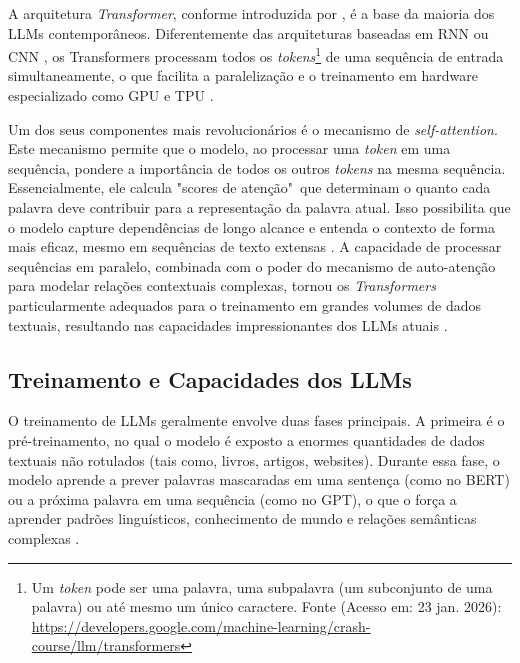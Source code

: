 A arquitetura \textit{Transformer}, conforme introduzida por
, é a base da maioria dos \gls{LLM}s
contemporâneos.  Diferentemente das arquiteturas baseadas em \gls{RNN} ou
\gls{CNN} \cite{lecun1998gradient}, os Transformers processam todos os
\textit{tokens}\footnote{Um \textit{token} pode ser uma palavra, uma subpalavra (um subconjunto de
	uma palavra) ou até mesmo um único caractere.  Fonte (Acesso em: 23 jan. 2026):
	\url{https://developers.google.com/machine-learning/crash-course/llm/transformers}} de
uma sequência de entrada simultaneamente, o que facilita a paralelização e o
treinamento em hardware especializado como \gls{GPU} e \gls{TPU}
\cite{lin2022survey}.

Um dos seus componentes mais revolucionários é o mecanismo de
\textit{self-attention}. Este mecanismo permite que o modelo, ao processar uma
\textit{token} em uma sequência, pondere a importância de todos os outros
\textit{tokens} na mesma sequência. Essencialmente, ele calcula "scores de
atenção"\ que determinam o quanto cada palavra deve contribuir para a
representação da palavra atual. Isso possibilita que o modelo capture
dependências de longo alcance e entenda o contexto de forma mais eficaz, mesmo
em sequências de texto extensas \cite{vaswani2017attention,
	naveed2023comprehensive}. A capacidade de processar sequências em paralelo,
combinada com o poder do mecanismo de auto-atenção para modelar relações
contextuais complexas, tornou os \textit{Transformers} particularmente adequados para o
treinamento em grandes volumes de dados textuais, resultando nas capacidades
impressionantes dos \gls{LLM}s atuais \cite{lin2022survey}.

\subsection{Treinamento e Capacidades dos \texorpdfstring{\gls{LLM}s}{LLMs}}
\label{subsec:treinamento_capacidades_llms}

O treinamento de \gls{LLM}s geralmente envolve duas fases principais. A primeira
é o pré-treinamento, no qual o modelo é exposto a enormes quantidades de dados
textuais não rotulados (tais como, livros, artigos, websites). Durante essa fase, o
modelo aprende a prever palavras mascaradas em uma sentença (como no \gls{BERT})
ou a próxima palavra em uma sequência (como no \gls{GPT}), o que o força a
aprender padrões linguísticos, conhecimento de mundo e relações semânticas
complexas \cite{liu2024understanding, naveed2023comprehensive}.


